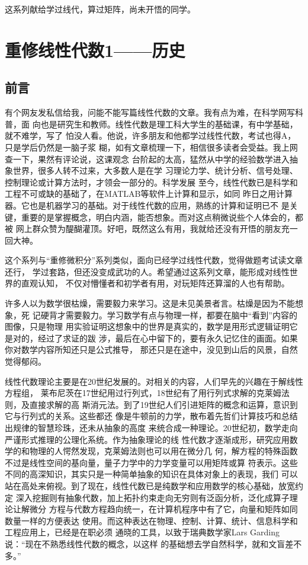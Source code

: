 这系列献给学过线代，算过矩阵，尚未开悟的同学。
\chapter{重修线性代数1——历史}
\section{前言}
有个网友发私信给我，问能不能写篇线性代数的文章。我有点为难，在科学网写科普，面
向也是研究生和教师。线性代数是理工科大学生的基础课，有中学基础，就不难学，写了
怕没人看。他说，许多朋友和他都学过线性代数，考试也得A，只是学后仍然是一脑子浆
糊，如有文章梳理一下，相信很多读者会受益。我上网查一下，果然有评论说，这课观念
台阶起的太高，猛然从中学的经验数学进入抽象世界，很多人转不过来，大多数人是在学
习理论力学、统计分析、信号处理、控制理论或计算方法时，才领会一部分的。科学发展
至今，线性代数已是科学和工程不可或缺的基础了，在MATLAB等软件上计算和显示，如同
昨日之用计算器。它也是机器学习的基础。对于线性代数的应用，熟练的计算和证明已不
是关键，重要的是掌握概念，明白内涵，能否想象。而对这点稍微说些个人体会的，都被
网上群众赞为醍醐灌顶。好吧，既然这么有用，我就给还没有开悟的朋友充一回大神。

这个系列与``重修微积分''系列类似，面向已经学过线性代数，觉得做题考试读文章还行，
学过套路，但还没变成武功的人。希望通过这系列文章，能形成对线性世界的直观认知，
不仅对懵懂者和初学者有用，对玩矩阵还算溜的人也有帮助。

许多人以为数学很枯燥，需要毅力来学习。这是未见美景者言。枯燥是因为不能想象，死
记硬背才需要毅力。学习数学有点与物理一样，都要在脑中``看到''内容的图像，只是物理
用实验证明这想象中的世界是真实的，数学是用形式逻辑证明它是对的，经过了求证的跋
涉，最后在心中留下的，要有永久记忆住的画面。如果你对数学内容所知还只是公式推导，
那还只是在途中，没见到山后的风景，自然觉得郁闷。

线性代数理论主要是在20世纪发展的。对相关的内容，人们早先的兴趣在于解线性方程组，
莱布尼茨在17世纪用过行列式，18世纪有了用行列式求解的克莱姆法则，及直接求解的高
斯消元法。到了19世纪人们引进矩阵的概念和运算，意识到它与行列式的关系。这些都还
像是牛顿前的力学，散布着先哲们计算技巧和总结出规律的智慧珍珠，还未从抽象的高度
来统合成一种理论。20世纪初，数学走向严谨形式推理的公理化系统。作为抽象理论的线
性代数才逐渐成形，研究应用数学的和物理的人愕然发现，克莱姆法则也可以用在微分几
何，解方程的特殊函数不过是线性空间的基向量，量子力学中的力学变量可以用矩阵或算
符表示。这些不同的高深知识，其实只是一种简单抽象的知识在具体对象上的表现，我们
可以站在高处来俯视。到了现在，线性代数已是纯数学和应用数学的核心基础，放宽约定
深入挖掘则有抽象代数，加上拓扑约束走向无穷则有泛函分析，泛化成算子理论让解微分
方程与代数方程趋向统一，在计算机程序中有了它，向量和矩阵如同数量一样的方便表达
使用。而这种表达在物理、控制、计算、统计、信息科学和工程应用上，已经是在职必须
通晓的工具，以致于瑞典数学家Lars Garding说：``现在不熟悉线性代数的概念，以这样
的基础想去学自然科学，就和文盲差不多。''

